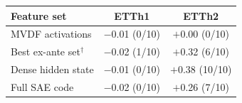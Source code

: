 \begin{tabular}{|l|c|c|}
\hline
Feature set & ETTh1 & ETTh2 \\
\hline
MVDF activations & $-$0.01 (0/10) & $+$0.00 (0/10) \\
Best ex-ante set$^{\dagger}$ & $-$0.02 (1/10) & $+$0.32 (6/10) \\
Dense hidden state & $-$0.01 (0/10) & $+$0.38 (10/10) \\
Full SAE code & $-$0.02 (0/10) & $+$0.26 (7/10) \\
\hline
\end{tabular}
